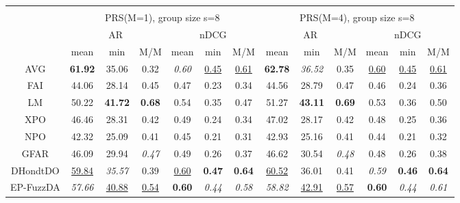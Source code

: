 \begin{tabular}{ c | c c c | c c c || c c c | c c c}
\multicolumn{12}{c}{} \\
\multicolumn{1}{c}{} & \multicolumn{6}{c}{PRS(M=1), group size s=8} & \multicolumn{6}{c}{PRS(M=4), group size s=8} \\
\multicolumn{1}{c}{} & \multicolumn{3}{c}{AR} & \multicolumn{3}{c}{nDCG} & \multicolumn{3}{c}{AR} & \multicolumn{3}{c}{nDCG} \\
& mean & min & M/M & mean & min & M/M & mean & min & M/M & mean & min & M/M \\
\hline
AVG & \textbf{61.92} & 35.06 & 0.32 & \textit{0.60} & \underline{0.45} & \underline{0.61} & \textbf{62.78} & \textit{36.52} & 0.35 & \underline{0.60} & \underline{0.45} & \underline{0.61} \\
FAI & 44.06 & 28.14 & 0.45 & 0.47 & 0.23 & 0.34 & 44.56 & 28.79 & 0.47 & 0.46 & 0.24 & 0.36 \\
LM & 50.22 & \textbf{41.72} & \textbf{0.68} & 0.54 & 0.35 & 0.47 & 51.27 & \textbf{43.11} & \textbf{0.69} & 0.53 & 0.36 & 0.50 \\
XPO & 46.46 & 28.31 & 0.42 & 0.49 & 0.24 & 0.34 & 47.02 & 28.17 & 0.42 & 0.48 & 0.25 & 0.36 \\
NPO & 42.32 & 25.09 & 0.41 & 0.45 & 0.21 & 0.31 & 42.93 & 25.16 & 0.41 & 0.44 & 0.21 & 0.32 \\
GFAR & 46.09 & 29.94 & \textit{0.47} & 0.49 & 0.26 & 0.37 & 46.62 & 30.54 & \textit{0.48} & 0.48 & 0.26 & 0.38 \\
DHondtDO & \underline{59.84} & \textit{35.57} & 0.39 & \underline{0.60} & \textbf{0.47} & \textbf{0.64} & \underline{60.52} & 36.01 & 0.41 & \textit{0.59} & \textbf{0.46} & \textbf{0.64} \\
EP-FuzzDA & \textit{57.66} & \underline{40.88} & \underline{0.54} & \textbf{0.60} & \textit{0.44} & \textit{0.58} & \textit{58.82} & \underline{42.91} & \underline{0.57} & \textbf{0.60} & \textit{0.44} & \textit{0.61} \\

\end{tabular}
